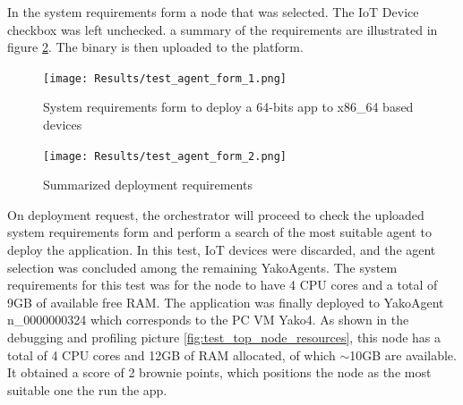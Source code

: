             
              In the system requirements form a node that was selected. The IoT Device checkbox was left unchecked. a summary of the requirements are illustrated in figure \ref{fig:test_agent_form_2}. The binary is then uploaded to the platform.
            
            \begin{figure}[H]
                \centering
                \texttt{[image: Results/test\_agent\_form\_1.png]}
                \caption{System requirements form to deploy a 64-bits app to x86\_64 based devices}
                \label{fig:test_agent_form_1}
            \end{figure}
            
            \begin{figure}[H]
                \centering
                \texttt{[image: Results/test\_agent\_form\_2.png]}
                \caption{Summarized deployment requirements}
                \label{fig:test_agent_form_2}
            \end{figure}
            
            
            On deployment request, the orchestrator will proceed to check the uploaded system requirements form and perform a search of the most suitable agent to deploy the application. In this test, IoT devices were discarded, and the agent selection was concluded among the remaining YakoAgents.
            The system requirements for this test was for the node to have 4 CPU cores and a total of 9GB of available free RAM. The application was finally deployed to YakoAgent n\_0000000324 which corresponds to the PC VM Yako4. As shown in the debugging and profiling picture \ref{fig:test_top_node_resources}, this node has a total of 4 CPU cores and 12GB of RAM allocated, of which $\mathtt{\sim}$10GB are available. It obtained a score of 2 brownie points, which positions the node as the most suitable one the run the app.
            
